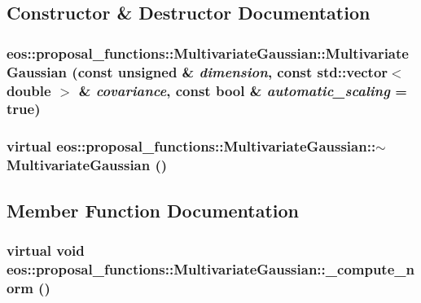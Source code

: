 \subsection{Constructor \& Destructor Documentation}
\hypertarget{classeos_1_1proposal__functions_1_1MultivariateGaussian_a9052192755db179db5e204c2bb0ad3f3}{
\subsubsection[{MultivariateGaussian}]{\setlength{\rightskip}{0pt plus 5cm}eos::proposal\_\-functions::MultivariateGaussian::MultivariateGaussian (const unsigned \& {\em dimension}, \/  const std::vector$<$ double $>$ \& {\em covariance}, \/  const bool \& {\em automatic\_\-scaling} = {\ttfamily true})}}
\label{classeos_1_1proposal__functions_1_1MultivariateGaussian_a9052192755db179db5e204c2bb0ad3f3}
\hypertarget{classeos_1_1proposal__functions_1_1MultivariateGaussian_a18dde9d78f6ec8a459443396648ee990}{
\subsubsection[{$\sim$MultivariateGaussian}]{\setlength{\rightskip}{0pt plus 5cm}virtual eos::proposal\_\-functions::MultivariateGaussian::$\sim$MultivariateGaussian ()}}
\label{classeos_1_1proposal__functions_1_1MultivariateGaussian_a18dde9d78f6ec8a459443396648ee990}


\subsection{Member Function Documentation}
\hypertarget{classeos_1_1proposal__functions_1_1MultivariateGaussian_ac797f04a7bce3b029cfc32af0d6ecd07}{
\subsubsection[{\_\-compute\_\-norm}]{\setlength{\rightskip}{0pt plus 5cm}virtual void eos::proposal\_\-functions::MultivariateGaussian::\_\-compute\_\-norm ()}}
\label{classeos_1_1proposal__functions_1_1MultivariateGaussian_ac797f04a7bce3b029cfc32af0d6ecd07}


